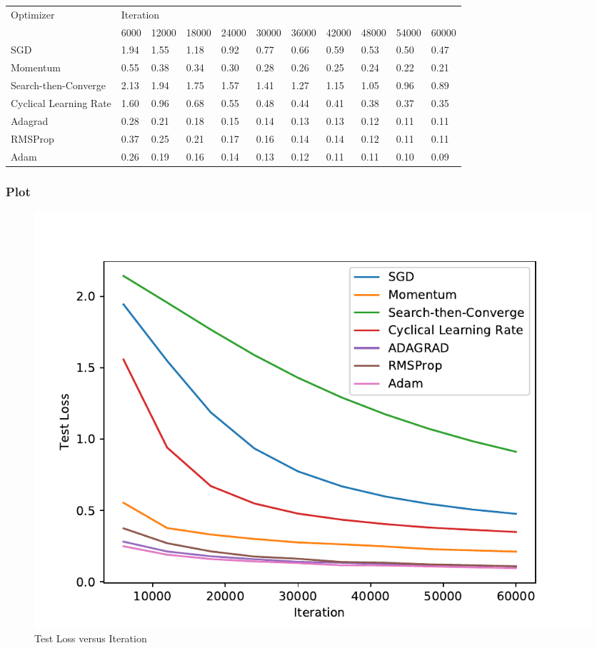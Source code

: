 \documentclass{article}
\begin{document}
	\begin{table}[H]
		\hskip-2.0cm\begin{tabular}{@{}|l|l|l|l|l|l|l|l|l|l|l|@{}}
			\toprule
			\multirow{2}{*}{Optimizer} & \multicolumn{10}{l|}{Iteration}                                              \\ \cmidrule(l){2-11} 
			& 6000 & 12000 & 18000 & 24000 & 30000 & 36000 & 42000 & 48000 & 54000 & 60000 \\ \midrule
			SGD                        & 1.94 & 1.55  & 1.18  & 0.92  & 0.77  & 0.66  & 0.59  & 0.53  & 0.50  & 0.47  \\ \midrule
			Momentum                   & 0.55 & 0.38  & 0.34  & 0.30  & 0.28  & 0.26  & 0.25  & 0.24  & 0.22  & 0.21  \\ \midrule
			Search-then-Converge       & 2.13 & 1.94  & 1.75  & 1.57  & 1.41  & 1.27  & 1.15  & 1.05  & 0.96  & 0.89  \\ \midrule
			Cyclical Learning Rate     & 1.60 & 0.96  & 0.68  & 0.55  & 0.48  & 0.44  & 0.41  & 0.38  & 0.37  & 0.35  \\ \midrule
			Adagrad                    & 0.28 & 0.21  & 0.18  & 0.15  & 0.14  & 0.13  & 0.13  & 0.12  & 0.11  & 0.11  \\ \midrule
			RMSProp                    & 0.37 & 0.25  & 0.21  & 0.17  & 0.16  & 0.14  & 0.14  & 0.12  & 0.11  & 0.11  \\ \midrule
			Adam                       & 0.26 & 0.19  & 0.16  & 0.14  & 0.13  & 0.12  & 0.11  & 0.11  & 0.10  & 0.09  \\ \bottomrule
		\end{tabular}
	
	
	\end{table}

\subsubsection{Plot}
\begin{figure}[H]
	\includegraphics[width=\textwidth, keepaspectratio]{TestLoss.pdf}
	\setlength{\belowcaptionskip}{0.0pt}	
	\caption{Test Loss versus Iteration}
\end{figure}
\end{document}
